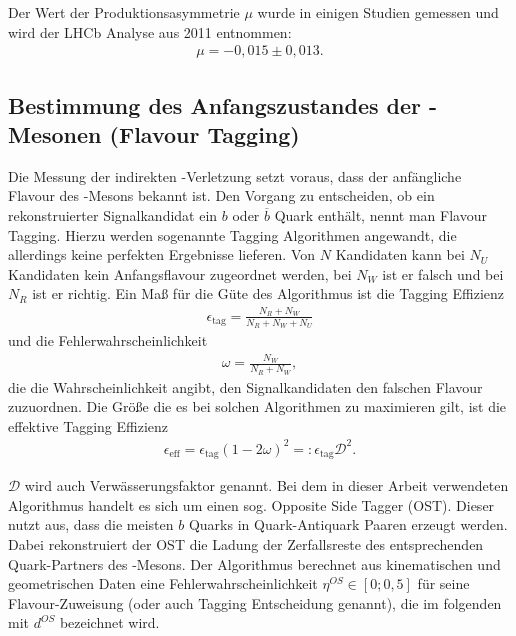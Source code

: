 Der Wert der Produktionsasymmetrie $\mu$ wurde in einigen Studien gemessen und wird der LHCb Analyse aus 2011 \cite{lhcb-paper} entnommen:
\begin{align}
\mu = -0,015 \pm 0,013 .
\end{align}

\subsection{Bestimmung des Anfangszustandes der \Bd-Mesonen (Flavour Tagging)} \label{kap:tagging}
Die Messung der indirekten \CP-Verletzung setzt voraus, dass der anfängliche Flavour des \Bd-Mesons bekannt ist. Den Vorgang zu entscheiden, ob ein rekonstruierter Signalkandidat ein $b$ oder $\overline{b}$ Quark enthält, nennt man \glqq Flavour Tagging\grqq. Hierzu werden sogenannte Tagging Algorithmen angewandt, die allerdings keine perfekten Ergebnisse lieferen. Von $N$ Kandidaten kann bei $N_U$ Kandidaten kein Anfangsflavour zugeordnet werden, bei $N_W$ ist er falsch und bei $N_R$ ist er richtig. Ein Maß für die Güte des Algorithmus ist die Tagging Effizienz
\begin{align}
\epsilon_{\text{tag}} = \frac{N_R+N_W}{N_R+N_W+N_U}
\end{align}
und die Fehlerwahrscheinlichkeit
\begin{align}
\omega = \frac{N_W}{N_R+N_W},
\end{align}
die die Wahrscheinlichkeit angibt, den Signalkandidaten den falschen Flavour zuzuordnen. Die Größe die es bei solchen Algorithmen zu maximieren gilt, ist die effektive Tagging Effizienz
\begin{align}
\epsilon_{\text{eff}} = \epsilon_{\text{tag}}(1-2\omega)^2 =: \epsilon_{\text{tag}} \mathcal{D}^2.
\end{align}

$\mathcal{D}$ wird auch Verwässerungsfaktor genannt. Bei dem in dieser Arbeit verwendeten Algorithmus handelt es sich um einen sog. Opposite Side Tagger (OST). Dieser nutzt aus, dass die meisten $b$ Quarks in Quark-Antiquark Paaren erzeugt werden. Dabei rekonstruiert der OST die Ladung der Zerfallsreste des entsprechenden Quark-Partners des \Bd-Mesons. Der Algorithmus berechnet aus kinematischen und geometrischen Daten eine Fehlerwahrscheinlichkeit $\eta^{OS} \in [0;0,5]$ für seine Flavour-Zuweisung (oder auch Tagging Entscheidung genannt), die im folgenden mit $d^{OS}$ bezeichnet wird. \cite{lhcb-paper}

